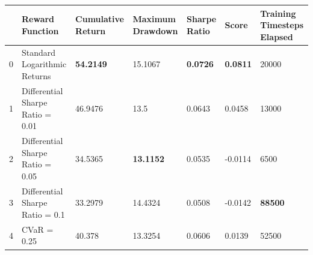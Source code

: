\begin{tabular}{lllllll}
\toprule
 & Reward Function & Cumulative Return & Maximum Drawdown & Sharpe Ratio & Score & Training Timesteps Elapsed \\
\midrule
0 & Standard Logarithmic Returns & \textbf{54.2149} & 15.1067 & \textbf{0.0726} & \textbf{0.0811} & 20000 \\
1 & Differential Sharpe Ratio = 0.01 & 46.9476 & 13.5 & 0.0643 & 0.0458 & 13000 \\
2 & Differential Sharpe Ratio = 0.05 & 34.5365 & \textbf{13.1152} & 0.0535 & -0.0114 & 6500 \\
3 & Differential Sharpe Ratio = 0.1 & 33.2979 & 14.4324 & 0.0508 & -0.0142 & \textbf{88500} \\
4 & CVaR = 0.25 & 40.378 & 13.3254 & 0.0606 & 0.0139 & 52500 \\
\bottomrule
\end{tabular}
